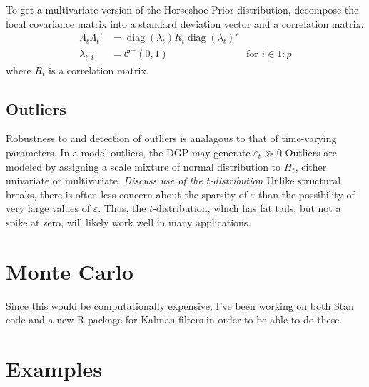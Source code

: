 \documentclass{article}
\newcommand{\paren}[1]{\ensuremath{\left(#1\right)}}
\newcommand{\dhalfcauchy}[1]{\ensuremath{\mathcal{C}^{+}\paren{#1}}}
\DeclareMathOperator{\diag}{diag}
\begin{document}
To get a multivariate version of the Horseshoe Prior distribution, decompose the local covariance matrix into a standard deviation vector and a correlation matrix.%
\begin{align}
  \label{eq:16}
  \Lambda_{t} \Lambda_{t}' &= \diag(\lambda_{t}) R_{t} \diag(\lambda_{t})' \\
  \label{eq:17}
  \lambda_{t,i} &= \dhalfcauchy{0, 1} & \text{for $i \in 1:p$}
\end{align}
where $R_{t}$ is a correlation matrix.

\subsection{Outliers}
\label{sec:outliers}

Robustness to and detection of outliers is analagous to that of time-varying parameters.
In a model outliers, the DGP may generate $\varepsilon_{t} \gg 0$
Outliers are modeled by assigning a scale mixture of normal distribution to $H_{t}$, either univariate or multivariate.
\textit{Discuss use of the t-distribution}
Unlike structural breaks, there is often less concern about the sparsity of $\varepsilon$ than the possibility of very large values of $\varepsilon$. 
Thus, the $t$-distribution, which has fat tails, but not a spike at zero, will likely work well in many applications.


\section{Monte Carlo}
\label{sec:monte-carlo}

Since this would be computationally expensive, I've been working on both Stan code and a new R package for Kalman filters in order to be able to do these.

\section{Examples}
\label{sec:examples}


\end{document}
